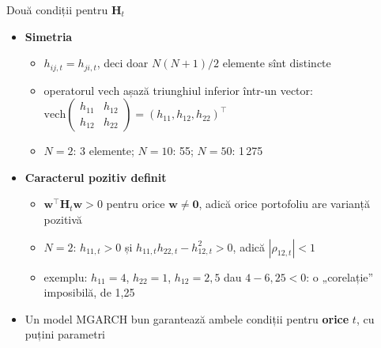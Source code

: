 \begin{frame}{Două condiții pentru $\mathbf{H}_t$}
\itemsize{\small}
\begin{itemize}
    \item \textbf{Simetria}
    \begin{itemize}
        \item $h_{ij,t} = h_{ji,t}$, deci doar $N(N+1)/2$ elemente sînt distincte
        \item operatorul $\mathrm{vech}$ așază triunghiul inferior într-un vector: $\mathrm{vech}\begin{pmatrix} h_{11} & h_{12}\\ h_{12} & h_{22}\end{pmatrix} = (h_{11}, h_{12}, h_{22})^\top$
        \item $N = 2$: 3 elemente; $N = 10$: 55; $N = 50$: 1\,275
    \end{itemize}
    \item \textbf{Caracterul pozitiv definit}
    \begin{itemize}
        \item $\mathbf{w}^\top\mathbf{H}_t\mathbf{w} > 0$ pentru orice $\mathbf{w} \neq \mathbf{0}$, adică orice portofoliu are varianță pozitivă
        \item $N = 2$: $h_{11,t} > 0$ și $h_{11,t}h_{22,t} - h_{12,t}^2 > 0$, adică $|\rho_{12,t}| < 1$
        \item exemplu: $h_{11} = 4$, $h_{22} = 1$, $h_{12} = 2{,}5$ dau $4 - 6{,}25 < 0$: o „corelație” imposibilă, de 1,25
    \end{itemize}
    \item Un model MGARCH bun garantează ambele condiții pentru \textbf{orice} $t$, cu puțini parametri
\end{itemize}
\end{frame}

